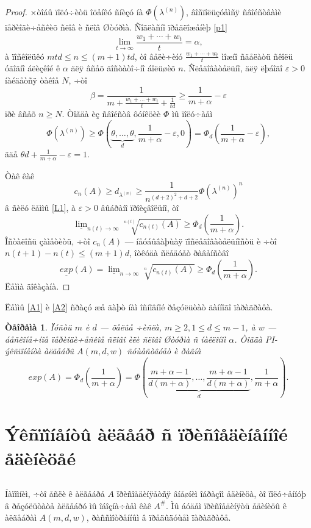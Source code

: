 \documentclass{article}
\numberwithin{equation}{section}
\theoremstyle{plain}
\newtheorem{theorem}{Òåîðåìà}
\theoremstyle{definition}
\newtheorem{proof}{Äîêàçàòåëüñòâî}
\begin{document}
\begin{fulltext}
\begin{proof}
×òîáû ïîëó÷èòü îöåíêó ñíèçó íà $\Phi(\lambda^{(n)})$, âîñïîëüçóåìñÿ ñâîéñòâàìè ïåðèîäè÷åñêèõ 
ñëîâ è ñëîâ Øòóðìà. Ñîãëàñíî ïðåäëîæåíèþ \ref{p1}
$$
\lim_{t\to\infty} \frac{w_1+\cdots+w_t}{t}=\alpha,
$$
à ïîñêîëüêó $mtd \le n \le (m+1)td$, òî âåëè÷èíó $\frac{w_1+\cdots+w_t}{t}$ ìîæíî ñäåëàòü
ñêîëü óãîäíî áëèçêîé ê $\alpha$ äëÿ âñåõ äîñòàòî÷íî áîëüøèõ $n$. Ñëåäîâàòåëüíî, äëÿ
ëþáîãî $\varepsilon>0$ íàéäåòñÿ òàêîå $N$, ÷òî
$$
\beta=\frac{1}{m+\frac{w_1+\ldots+w_t}{t}+\frac{1}{td}} \ge\frac{1}{m+\alpha}-\varepsilon
$$
ïðè âñåõ $n\ge N$. Òîãäà èç ñâîéñòâ ôóíêöèè $\Phi$ ìû ïîëó÷àåì
$$
\Phi(\lambda^{(n)})\ge
\Phi\left(\underbrace{\theta,\ldots,\theta}_{d},\frac{1}{m+\alpha}-\varepsilon,0\right)=
\Phi_d\left(\frac{1}{m+\alpha}-\varepsilon\right),
$$
ãäå $\theta d+ \frac{1}{m+\alpha}-\varepsilon=1$.

Òàê êàê 
$$
c_n(A)\ge d_{\lambda^{(n)}} \ge \frac{1}{n^{(d+2)^2+d+2}}\Phi\left(\lambda^{(n)} \right)^n
$$
â ñèëó ëåììû \ref{L1}, à $\varepsilon >0$ âûáðàíî ïðîèçâîëüíî, òî
$$
\underline{\lim}_{n(t)\to\infty} \sqrt[n(t)]{c_{n(t)}(A)} \ge 
\Phi_d\left(\frac{1}{m+\alpha}\right).
$$
Îñòàëîñü çàìåòèòü, ÷òî $c_n(A)$ --- íåóáûâàþùàÿ ïîñëåäîâàòåëüíîñòü è ÷òî 
$n(t+1)-n(t) \le (m+1)d$, îòêóäà ñëåäóåò ðàâåíñòâî
$$
\underline{exp}(A)=\underline{\lim}_{n\to\infty} \sqrt[n]{c_{n(t)}(A)} \ge 
\Phi_d\left(\frac{1}{m+\alpha}\right).
$$
Ëåììà äîêàçàíà.
\end{proof}

Ëåììû \ref{A1} è \ref{A2} ñðàçó æå äàþò íàì îñíîâíîé ðåçóëüòàò äàííîãî ïàðàãðàôà.

\begin{theorem}\label{t1}
Ïóñòü $m$ è $d$ --- öåëûå ÷èñëà, $m\ge 2, 1\le d \le m-1$, à $w$ --- áåñêîíå÷íîå ïåðèîäè÷åñêîå 
ñëîâî èëè ñëîâî Øòóðìà ñ  íàêëîíîì $\alpha$. Òîãäà PI-ýêñïîíåíòà àëãåáðû $A(m,d,w)$ ñóùåñòâóåò è ðàâíà
$$
exp(A)=\Phi_d\left(\frac{1}{m+\alpha} \right)=
\Phi\left(\underbrace{\frac{m+\alpha-1}{d(m+\alpha)},\ldots,
\frac{m+\alpha-1}{d(m+\alpha)}}_d,\frac{1}{m+\alpha} \right).
$$
\end{theorem}
 

\section{Ýêñïîíåíòû àëãåáð ñ ïðèñîåäèíåííîé åäèíèöåé}\label{s4}

\subsection{}\label{s4.1}
Íàïîìíèì, ÷òî åñëè ê àëãåáðå $A$ ïðèñîåäèíÿåòñÿ âíåøíèì îáðàçîì åäèíèöà, òî ïîëó÷åííóþ 
â ðåçóëüòàòå àëãåáðó ìû îáîçíà÷àåì êàê $A^\#$. Ìû áóäåì ïðèñîåäèíÿòü åäèíèöû ê àëãåáðàì
$A(m,d,w)$, ðàññìîòðåííûì â ïðåäûäóùåì ïàðàãðàôå.


\end{fulltext}
\end{document}
